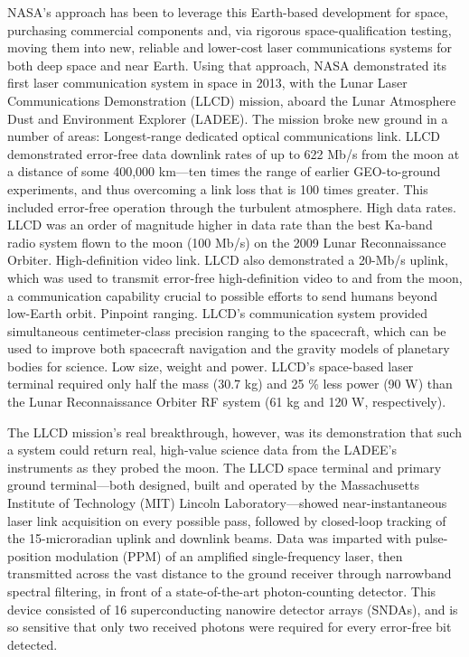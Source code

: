 NASA’s approach has been to leverage this Earth-based development for space, purchasing commercial components and, via rigorous space-qualification testing, moving them into new, reliable and lower-cost laser communications systems for both deep space and near Earth. Using that approach, NASA demonstrated its first laser communication system in space in 2013, with the Lunar Laser Communications Demonstration (LLCD) mission, aboard the Lunar Atmosphere Dust and Environment Explorer (LADEE). The mission broke new ground in a number of areas:
Longest-range dedicated optical communications link. LLCD demonstrated error-free data downlink rates of up to 622 Mb/s from the moon at a distance of some 400,000 km—ten times the range of earlier GEO-to-ground experiments, and thus overcoming a link loss that is 100 times greater. This included error-free operation through the turbulent atmosphere.
High data rates. LLCD was an order of magnitude higher in data rate than the best Ka-band radio system flown to the moon (100 Mb/s) on the 2009 Lunar Reconnaissance Orbiter.
High-definition video link. LLCD also demonstrated a 20-Mb/s uplink, which was used to transmit error-free high-definition video to and from the moon, a communication capability crucial to possible efforts to send humans beyond low-Earth orbit.
Pinpoint ranging. LLCD’s communication system provided simultaneous centimeter-class precision ranging to the spacecraft, which can be used to improve both spacecraft navigation and the gravity models of planetary bodies for science.
Low size, weight and power. LLCD’s space-based laser terminal required only half the mass (30.7 kg) and 25 \% less power (90 W) than the Lunar Reconnaissance Orbiter RF system (61 kg and 120 W, respectively).

The LLCD mission’s real breakthrough, however, was its demonstration that such a system could return real, high-value science data from the LADEE's instruments as they probed the moon. The LLCD space terminal and primary ground terminal—both designed, built and operated by the Massachusetts Institute of Technology (MIT) Lincoln Laboratory—showed near-instantaneous laser link acquisition on every possible pass, followed by closed-loop tracking of the 15-microradian uplink and downlink beams. Data was imparted with pulse-position modulation (PPM) of an amplified single-frequency laser, then transmitted across the vast distance to the ground receiver through narrowband spectral filtering, in front of a state-of-the-art photon-counting detector. This device consisted of 16 superconducting nanowire detector arrays (SNDAs), and is so sensitive that only two received photons were required for every error-free bit detected.


